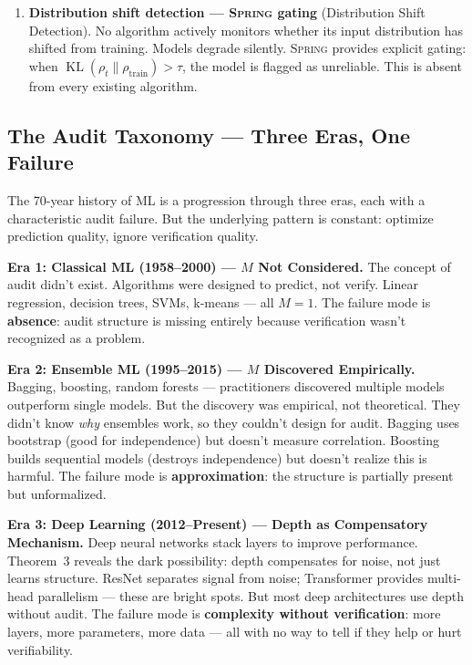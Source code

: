 \documentclass[12pt,a4paper]{article}
\theoremstyle{definition}
\newcommand{\Spring}{\textsc{Spring}}
\DeclareMathOperator{\KL}{KL}
\begin{document}
\begin{enumerate}[label=\textbf{\arabic*.}, nosep, leftmargin=*]
    \item \textbf{Distribution shift detection — \Spring{} gating} (Distribution Shift Detection). No algorithm actively monitors whether its input distribution has shifted from training. Models degrade silently. \Spring{} provides explicit gating: when $\KL(\rho_t \| \rho_{\text{train}}) > \tau$, the model is flagged as unreliable. This is absent from every existing algorithm.
    
\end{enumerate}

\subsection{The Audit Taxonomy — Three Eras, One Failure}

The 70-year history of ML is a progression through three eras, each with a characteristic audit failure. But the underlying pattern is constant: optimize prediction quality, ignore verification quality.

\noindent\textbf{Era 1: Classical ML (1958--2000) — $M$ Not Considered.} The concept of audit didn't exist. Algorithms were designed to predict, not verify. Linear regression, decision trees, SVMs, k-means — all $M=1$. The failure mode is \textbf{absence}: audit structure is missing entirely because verification wasn't recognized as a problem.

\noindent\textbf{Era 2: Ensemble ML (1995--2015) — $M$ Discovered Empirically.} Bagging, boosting, random forests — practitioners discovered multiple models outperform single models. But the discovery was empirical, not theoretical. They didn't know \textit{why} ensembles work, so they couldn't design for audit. Bagging uses bootstrap (good for independence) but doesn't measure correlation. Boosting builds sequential models (destroys independence) but doesn't realize this is harmful. The failure mode is \textbf{approximation}: the structure is partially present but unformalized.

\noindent\textbf{Era 3: Deep Learning (2012--Present) — Depth as Compensatory Mechanism.} Deep neural networks stack layers to improve performance. Theorem~3 reveals the dark possibility: depth compensates for noise, not just learns structure. ResNet separates signal from noise; Transformer provides multi-head parallelism — these are bright spots. But most deep architectures use depth without audit. The failure mode is \textbf{complexity without verification}: more layers, more parameters, more data — all with no way to tell if they help or hurt verifiability.
\end{document}
